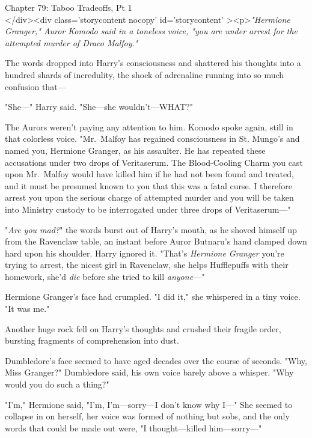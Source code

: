 
Chapter 79: Taboo Tradeoffs, Pt 1\\
</div><div  class='storycontent nocopy' id='storycontent' ><p>\emph{"Hermione 
Granger," Auror Komodo said in a toneless voice, "you are under arrest for the 
attempted murder of Draco Malfoy."}

The words dropped into Harry's consciousness and shattered his thoughts into a 
hundred shards of incredulity, the shock of adrenaline running into so much 
confusion that---

"She---" Harry said. "She---she wouldn't---WHAT?"

The Aurors weren't paying any attention to him. Komodo spoke again, still in 
that colorless voice. "Mr.~Malfoy has regained consciousness in St. Mungo's and 
named you, Hermione Granger, as his assaulter. He has repeated these 
accusations under two drops of Veritaserum. The Blood-Cooling Charm you cast 
upon Mr.~Malfoy would have killed him if he had not been found and treated, and 
it must be presumed known to you that this was a fatal curse. I therefore 
arrest you upon the serious charge of attempted murder and you will be taken 
into Ministry custody to be interrogated under three drops of Veritaserum---"

"\emph{Are you mad?}" the words burst out of Harry's mouth, as he shoved 
himself up from the Ravenclaw table, an instant before Auror Butnaru's hand 
clamped down hard upon his shoulder. Harry ignored it. "That's \emph{Hermione 
Granger} you're trying to arrest, the nicest girl in Ravenclaw, she helps 
Hufflepuffs with their homework, she'd \emph{die} before she tried to kill 
\emph{anyone---}"

Hermione Granger's face had crumpled. "I did it," she whispered in a tiny 
voice. "It was me."

Another huge rock fell on Harry's thoughts and crushed their fragile order, 
bursting fragments of comprehension into dust.

Dumbledore's face seemed to have aged decades over the course of seconds. "Why, 
Miss Granger?" Dumbledore said, his own voice barely above a whisper. "Why 
would you do such a thing?"

"I'm," Hermione said, "I'm, I'm---sorry---I don't know why I---" She seemed to 
collapse in on herself, her voice was formed of nothing but sobs, and the only 
words that could be made out were, "I thought---killed him---sorry---"

